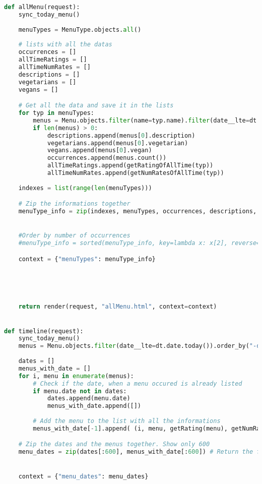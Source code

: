 \begin{lstlisting}[language=Python]
def allMenu(request):
    sync_today_menu()
    
    menuTypes = MenuType.objects.all()
    
    # lists with all the datas
    occurrences = []
    allTimeRatings = []
    allTimeNumRates = []
    descriptions = []
    vegetarians = []
    vegans = []

    # Get all the data and save it in the lists
    for typ in menuTypes:
        menus = Menu.objects.filter(name=typ.name).filter(date__lte=dt.date.today())
        if len(menus) > 0:
            descriptions.append(menus[0].description)
            vegetarians.append(menus[0].vegetarian)
            vegans.append(menus[0].vegan)
            occurrences.append(menus.count())
            allTimeRatings.append(getRatingOfAllTime(typ))
            allTimeNumRates.append(getNumRatesOfAllTime(typ))
        
    indexes = list(range(len(menuTypes))) 

    # Zip the informations together
    menuType_info = zip(indexes, menuTypes, occurrences, descriptions, vegetarians, vegans, allTimeRatings, allTimeNumRates)


    #Order by number of occurrences
    #menuType_info = sorted(menuType_info, key=lambda x: x[2], reverse=True)  # Sort the menu info after occurrences -> lowest to highest

    context = {"menuTypes": menuType_info}


    
   

    return render(request, "allMenu.html", context=context)


def timeline(request):
    sync_today_menu()
    menus = Menu.objects.filter(date__lte=dt.date.today()).order_by("-date")
    
    dates = []
    menus_with_date = []
    for i, menu in enumerate(menus):
        # Check if the date, when a menu occured is already listed 
        if menu.date not in dates:
            dates.append(menu.date)
            menus_with_date.append([])
        
        # Add the menu to the list with all the informations
        menus_with_date[-1].append( (i, menu, getRating(menu), getNumRates(menu)) )

    # Zip the dates and the menus together. Show only 600
    menu_dates = zip(dates[:600], menus_with_date[:600]) # Return the first 600 menus


    context = {"menu_dates": menu_dates}  



\end{lstlisting}
